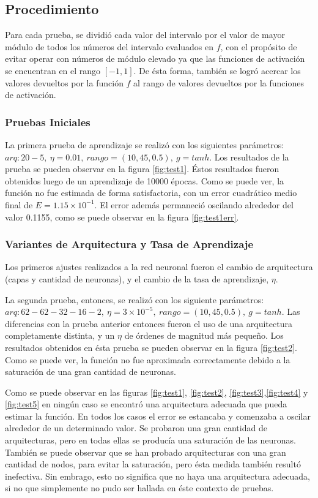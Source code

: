 \documentclass[12pt,a4paper]{article}
\begin{document}
\subsection{Procedimiento}

Para cada prueba, se dividió cada valor del intervalo por el valor de mayor módulo de todos los números del intervalo evaluados en $f$, con el propósito de evitar operar con números de módulo elevado ya que las funciones de activación se encuentran en el rango $[-1,1]$.  De ésta forma, también se logró acercar los valores devueltos por la función $f$ al rango de valores devueltos por la funciones de activación.

\subsubsection{Pruebas Iniciales}

La primera prueba de aprendizaje se realizó con los siguientes parámetros: $arq: 20-5,\ \eta=0.01,\ rango=(10, 45, 0.5),\ g=tanh$.  Los resultados de la prueba se pueden observar en la figura \ref{fig:test1}.  Éstos resultados fueron obtenidos luego de un aprendizaje de 10000 épocas.  Como se puede ver, la función no fue estimada de forma satisfactoria, con un error cuadrático medio final de $E=1.15 \times 10^{-1}$.  El error además permaneció oscilando alrededor del valor 0.1155, como se puede observar en la figura \ref{fig:test1err}.

\subsubsection{Variantes de Arquitectura y Tasa de Aprendizaje}

Los primeros ajustes realizados a la red neuronal fueron el cambio de arquitectura (capas y cantidad de neuronas), y el cambio de la tasa de aprendizaje, $\eta$.

La segunda prueba, entonces, se realizó con los siguiente parámetros: $arq: 62-62-32-16-2,\ \eta=3\times 10^{-5},\ rango=(10, 45, 0.5),\ g=tanh$.  Las diferencias con la prueba anterior entonces fueron el uso de una arquitectura completamente distinta, y un $\eta$ de órdenes de magnitud más pequeño.  Los resultados obtenidos en ésta prueba se pueden observar en la figura \ref{fig:test2}.  Como se puede ver, la función no fue aproximada correctamente debido a la saturación de una gran cantidad de neuronas.

Como se puede observar en las figuras \ref{fig:test1}, \ref{fig:test2}, \ref{fig:test3},\ref{fig:test4} y \ref{fig:test5} en ningún caso se encontró una arquitectura adecuada que pueda estimar la función. En todos los casos el error se estancaba y comenzaba a oscilar alrededor de un determinado valor. Se probaron una gran cantidad de arquitecturas, pero en todas ellas se producía una saturación de las neuronas. También se puede observar que se han probado arquitecturas con una gran cantidad de nodos, para evitar la saturación, pero ésta medida también resultó inefectiva. Sin embrago, esto no significa que no haya una arquitectura adecuada, si no que simplemente no pudo ser hallada en éste contexto de pruebas.
\end{document}
